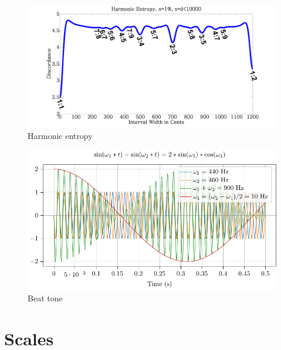 \documentclass{article}
\begin{document}
\begin{figure}[h!]
	\centering
	\hspace*{0cm}
	\includegraphics[scale=0.03, trim= {0cm 0cm 0cm 0cm}, clip]{figures/1.intervalles/Harmonic_entropy.png}
	\caption{Harmonic entropy}
	\label{fig:harmonic_entro}
\end{figure}

\begin{figure}[h!]
	\centering
	\hspace*{0cm}
	\includegraphics[scale=0.5, trim= {0cm 0cm 0cm 0cm}, clip]{figures/1.intervalles/battement/main.pdf}
	\caption{Beat tone}
	\label{fig:battement}
\end{figure}


\newpage
\section{Scales}

\end{document}
